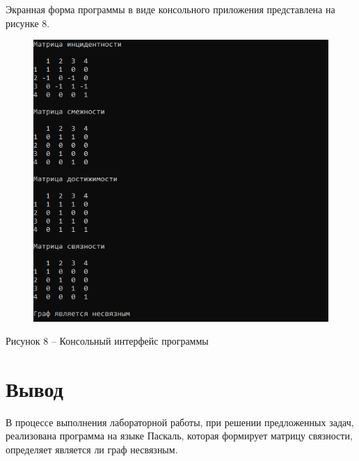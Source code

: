 \documentclass[a4paper,14pt]{extarticle}
\begin{document}
  \pagebreak
  Экранная форма программы в виде консольного приложения представлена на рисунке 8.

  \begin{figure}[h]
    \centering
    \includegraphics[width=0.9\linewidth]{images/image.png}
  \end{figure}
  \begin{center}
    Рисунок 8 – Консольный интерфейс программы
  \end{center}

  \section*{\hspace{12.5mm}Вывод}
  В процессе выполнения лабораторной работы, при решении предложенных задач, реализована программа на языке Паскаль, которая формирует матрицу связности, определяет является ли граф несвязным.
\end{document}
